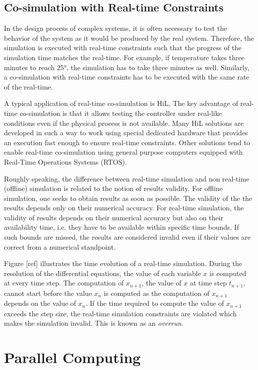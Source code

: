 \subsection{Co-simulation with Real-time Constraints}

In the design process of complex systems, it is often necessary to test the behavior of the system as it would be produced by the real system. Therefore, the simulation is executed with real-time constraints such that the progress of the simulation time matches the real-time. For example, if temperature takes three minutes to reach $25$°, the simulation has to take three minutes as well. Similarly, a co-simulation with real-time constraints has to be executed with the same rate of the real-time.

A typical application of real-time co-simulation is HiL. The key advantage of real-time co-simulation is that it allows testing the controller under real-like conditions even if the physical process is not available. Many HiL solutions are developed in such a way to work using special dedicated hardware that provides an execution fast enough to ensure real-time constraints. Other solutions tend to enable real-time co-simulation using general purpose computers equipped with Real-Time Operations Systems (RTOS).

Roughly speaking, the difference between real-time simulation and non real-time (offline) simulation is related to the notion of results validity. For offline simulation, one seeks to obtain results as soon as possible. The validity of the the results depends only on their numerical accuracy. For real-time simulation, the validity of results depends on their numerical accuracy but also on their availability time, i.e. they have to be available within specific time bounds. If such bounds are missed, the results are considered invalid even if their values are correct from a numerical standpoint.

Figure [ref] illustrates the time evolution of a real-time simulation. During the resolution of the differential equations, the value of each variable $x$ is computed at every time step. The computation of $x_{n+1}$, the value of $x$ at time step $t_{n+1}$, cannot start before the value $x_n$ is computed as the computation of $x_{n+1}$ depends on the value of $x_n$. If the time required to compute the value of $x_{n+1}$ exceeds the step size, the real-time simulation constraints are violated which makes the simulation invalid. This is known as an \textit{overrun}.
\section{Parallel Computing}

